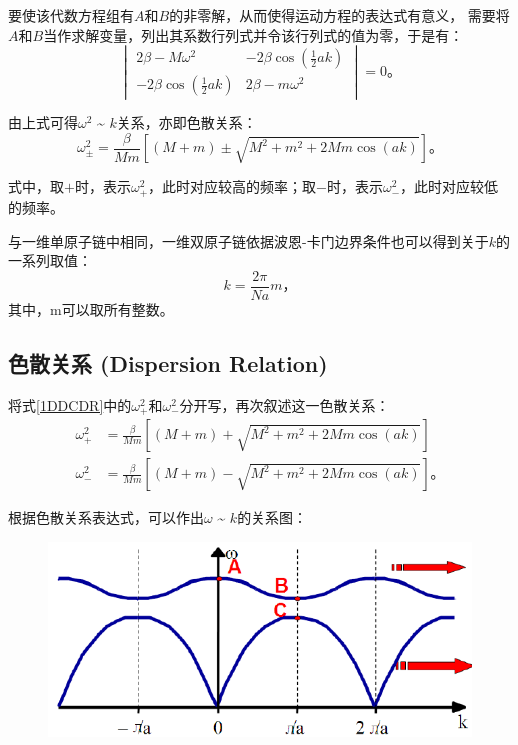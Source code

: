 \documentclass[declarePage]{ecnuthesis}
\begin{document}
要使该代数方程组有$A$和$B$的非零解，从而使得运动方程的表达式有意义，%
需要将$A$和$B$当作求解变量，列出其系数行列式并令该行列式的值为零，于是有：
\begin{equation}
    \begin{vmatrix}
        2 \beta - M \omega ^2 & -2 \beta \cos (\frac{1}{2}ak)\\
        -2\beta\cos (\frac{1}{2}ak) & 2\beta - m \omega ^2
    \end{vmatrix}
    =0 \text{。}
\end{equation}

由上式可得$\omega^2$ \~{} $k$关系，亦即色散关系：
\begin{equation}
    \omega^2_\pm=\frac{\beta}{Mm}[(M+m)\pm\sqrt{M^2+m^2+2Mm\cos(ak)}] \text{。} \label{1DDCDR}
\end{equation}

式中，取$+$时，表示$\omega_+^2$，此时对应较高的频率；取$-$时，表示$\omega_-^2$，此时对应较低的频率。

与一维单原子链中相同，一维双原子链依据波恩-卡门边界条件也可以得到关于$k$的一系列取值：
\begin{equation}
    k = \frac{2\pi}{Na}m \text{，} \label{1DDCK}
\end{equation}
其中，m可以取所有整数。

\subsection{色散关系 (Dispersion Relation)}

将式\ref{1DDCDR}中的$\omega_+^2$和$\omega_-^2$分开写，再次叙述这一色散关系：
\begin{align}
    \omega^2_+&=\frac{\beta}{Mm}[(M+m)+\sqrt{M^2+m^2+2Mm\cos(ak)}]\\
    \omega^2_-&=\frac{\beta}{Mm}[(M+m)-\sqrt{M^2+m^2+2Mm\cos(ak)}] \text{。}
\end{align}

根据色散关系表达式，可以作出$\omega$ \~{} $k$的关系图：
\begin{figure}[htb]
    \centering
    \includegraphics[width=.4\textwidth]{1DDCDR.png}
\end{figure}
\end{document}
